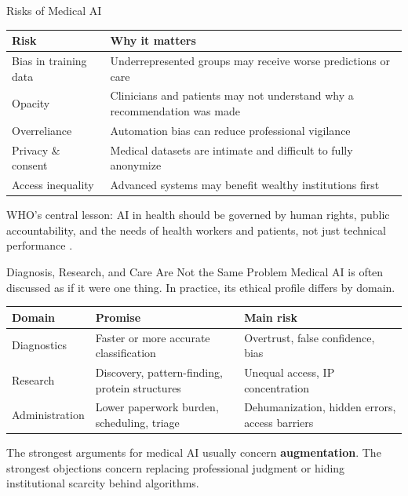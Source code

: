\documentclass[aspectratio=169,11pt]{beamer}
\begin{document}
\begin{frame}{Risks of Medical AI}
\begin{table}[h]
\centering
\scriptsize
\begin{tabular}{@{}p{3cm}p{9cm}@{}}
\toprule
\textbf{Risk} & \textbf{Why it matters} \\
\midrule
Bias in training data & Underrepresented groups may receive worse predictions or care \\
\addlinespace
Opacity & Clinicians and patients may not understand why a recommendation was made \\
\addlinespace
Overreliance & Automation bias can reduce professional vigilance \\
\addlinespace
Privacy \& consent & Medical datasets are intimate and difficult to fully anonymize \\
\addlinespace
Access inequality & Advanced systems may benefit wealthy institutions first \\
\bottomrule
\end{tabular}
\end{table}

\vspace{0.2cm}
WHO's central lesson: AI in health should be governed by human rights, public accountability, and the needs of health workers and patients, not just technical performance \parencite{who_ai_health_2021}.
\end{frame}

\begin{frame}{Diagnosis, Research, and Care Are Not the Same Problem}
Medical AI is often discussed as if it were one thing. In practice, its ethical profile differs by domain.

\vspace{0.2cm}
\begin{table}[h]
\centering
\scriptsize
\begin{tabular}{@{}p{3cm}p{3.5cm}p{4.8cm}@{}}
\toprule
\textbf{Domain} & \textbf{Promise} & \textbf{Main risk} \\
\midrule
Diagnostics & Faster or more accurate classification & Overtrust, false confidence, bias \\
\addlinespace
Research & Discovery, pattern-finding, protein structures & Unequal access, IP concentration \\
\addlinespace
Administration & Lower paperwork burden, scheduling, triage & Dehumanization, hidden errors, access barriers \\
\bottomrule
\end{tabular}
\end{table}

\vspace{0.2cm}
The strongest arguments for medical AI usually concern \textbf{augmentation}. The strongest objections concern replacing professional judgment or hiding institutional scarcity behind algorithms.
\end{frame}
\end{document}
